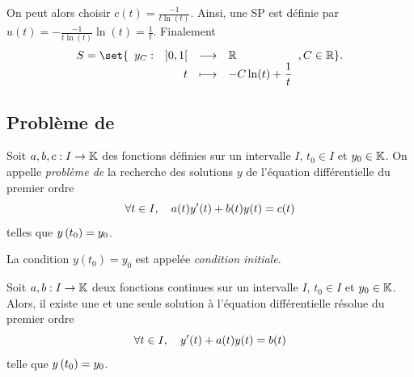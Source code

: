 \documentclass{magnolia}
\begin{document}
\begin{exos}
\begin{victor}
\begin{sol}
  On peut alors choisir $c(t)=\frac{-1}{t\ln(t)}$. Ainsi, une SP est définie par $u(t)=-\frac{-1}{t\ln(t)}\ln(t)=\frac{1}{t}$.
  Finalement $$S=\set{\dspappli{y_C}{]0,1[}{\R}{t}{-C\ln(t)+\frac{1}{t}}, C\in \R}.$$
  \end{sol}
    \end{victor}
\end{exos}

\subsection{Problème de }

\begin{definition}[nom={Problème de \nom{Cauchy}}]
Soit $a,b,c:I\to\mathbb{K}$ des fonctions définies sur un intervalle $I$, $t_0\in I$ et
$y_0\in\mathbb{K}$. On appelle \emph{problème de } la recherche des solutions $y$ de
l'équation différentielle du premier ordre
\[\forall t\in I ,\quad a(t)y'(t)+b(t)y(t)=c(t)\]
telles que $y\left(t_0\right)=y_0$.
\end{definition}

\begin{remarqueUnique}
\remarque La condition $y(t_0)=y_0$ est appelée \emph{condition initiale}.
\end{remarqueUnique}

\begin{theoreme}[nom={Théorème de \nom{Cauchy-Lipschitz}}]
Soit $a,b:I\to\mathbb{K}$ deux fonctions continues sur un intervalle $I$,
$t_0\in I$ et $y_0\in\mathbb{K}$. Alors, il existe une et une seule solution à 
l'équation différentielle résolue du premier ordre
\[\forall t\in I ,\quad y'(t)+a(t)y(t)=b(t)\]
telle que $y\left(t_0\right)=y_0$.
\end{theoreme}
\end{document}

